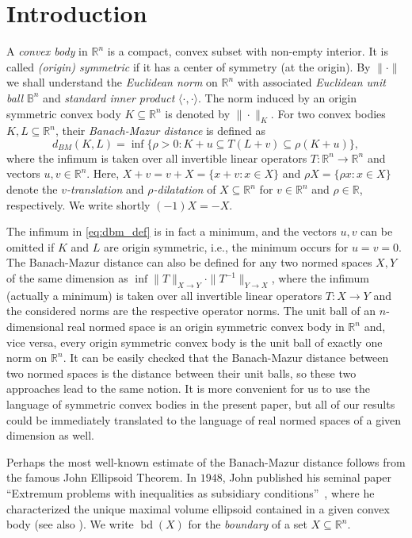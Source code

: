 \documentclass[12pt,a4paper]{article}
\theoremstyle{definition}
\DeclareMathOperator{\bd}{bd}
\newcommand\R{\mathbb{R}}
\newcommand\B{\mathbb{B}}
\newcommand\cemph[1]{\emph{\color{red}#1}}
\begin{document}
\section{Introduction}



A \cemph{convex body} in $\R^n$ is a compact, convex subset with non-empty interior. It is called \cemph{(origin) symmetric} if it has a center of symmetry (at the origin). By $\| \cdot \|$ we shall understand the \cemph{Euclidean norm} on $\R^n$ with associated \cemph{Euclidean unit ball} $\B^n$ and \cemph{standard inner product} $\langle \cdot, \cdot \rangle$. The norm induced by an origin symmetric convex body $K \subseteq \R^n$ is denoted by $\|\cdot\|_K$. For two convex bodies $K, L \subseteq \R^n$, their \cemph{Banach-Mazur distance} is defined as 
\begin{equation}
\label{eq:dbm_def}
d_{BM}(K,L) = \inf \{\rho >0 : K+ u \subseteq T(L+v) \subseteq \rho (K+u) \},
\end{equation}
where the infimum is taken over all invertible linear operators $T : \R^n \to \R^n$ and vectors $u, v \in \R^n$. Here, $X + v = v + X = \{ x + v : x \in X \}$ and $\rho X = \{ \rho x : x \in X \}$ denote the \cemph{$v$-translation} and \cemph{$\rho$-dilatation} of $X \subseteq \R^n$ for $v \in \R^n$ and $\rho \in \R$, respectively. We write shortly $(-1) X = - X$.

The infimum in \eqref{eq:dbm_def} is in fact a minimum, and the vectors $u,v$ can be omitted if $K$ and $L$ are origin symmetric, i.e., the minimum occurs for $u = v = 0$. The Banach-Mazur distance can also be defined for any two normed spaces $X, Y$ of the same dimension as $\inf \|T\|_{X \to Y} \cdot \|T^{-1}\|_{Y \to X}$, where the infimum (actually a minimum) is taken over all invertible linear operators $T: X \to Y$ and the considered norms are the respective operator norms. The unit ball of an $n$-dimensional real normed space is an origin symmetric convex body in $\R^n$ and, vice versa, every origin symmetric convex body is the unit ball of exactly one norm on $\R^n$. It can be easily checked that the Banach-Mazur distance between two normed spaces is the distance between their unit balls, so these two approaches lead to the same notion. It is more convenient for us to use the language of symmetric convex bodies in the present paper, but all of our results could be immediately translated to the language of real normed spaces of a given dimension as well.

Perhaps the most well-known estimate of the Banach-Mazur distance follows from the famous John Ellipsoid Theorem. In $1948$, John published his seminal paper ``Extremum problems with inequalities as subsidiary conditions''~\cite{john}, where he characterized the unique maximal volume ellipsoid contained in a given convex body (see also \cite[Theorem~$15.3$]{tomczak}). We write $\bd(X)$ for the \cemph{boundary} of a set $X \subseteq \R^n$.
\end{document}
